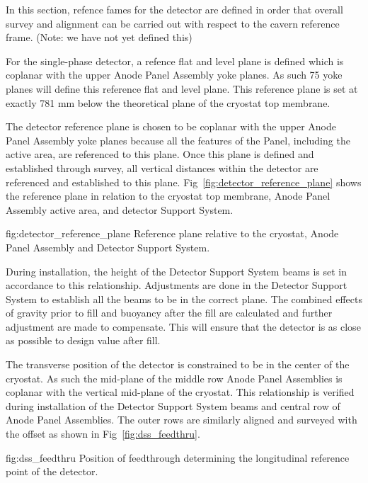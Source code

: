 In this section, refence fames for the detector are defined in order
that overall survey and alignment can be carried out with respect to
the cavern reference frame. (Note: we have not yet defined this)

For the single-phase detector, a refence flat and level plane is
defined which is coplanar with the upper Anode Panel Assembly yoke
planes. As such 75 yoke planes will define this reference flat and
level plane. This reference plane is set at exactly 781 mm below the
theoretical plane of the cryostat top membrane.

The detector reference plane is chosen to be coplanar with the upper
Anode Panel Assembly yoke planes because all the features of the
Panel, including the active area, are referenced to this plane.  Once
this plane is defined and established through survey, all vertical
distances within the detector are referenced and established to this
plane.  Fig~\ref{fig:detector_reference_plane} shows the reference
plane in relation to the cryostat top membrane, Anode Panel Assembly
active area, and detector Support System.
\begin{dunefigure}{fig:detector_reference_plane}
  {Reference plane relative to the cryostat, Anode Panel Assembly and Detector Support System.}
\end{dunefigure}

During installation, the height of the Detector Support System beams
is set in accordance to this relationship. Adjustments are done in the
Detector Support System to establish all the beams to be in the
correct plane. The combined effects of gravity prior to fill and
buoyancy after the fill are calculated and further adjustment are made
to compensate. This will ensure that the detector is as close as
possible to design value after fill.

The transverse position of the detector is constrained to be in the
center of the cryostat. As such the mid-plane of the middle row Anode
Panel Assemblies is coplanar with the vertical mid-plane of the
cryostat. This relationship is verified during installation of the
Detector Support System beams and central row of Anode Panel
Assemblies. The outer rows are similarly aligned and surveyed with the
offset as shown in Fig~\ref{fig:dss_feedthru}.
\begin{dunefigure}{fig:dss_feedthru}
  {Position of feedthrough determining the longitudinal reference point of the detector.}
\end{dunefigure}


